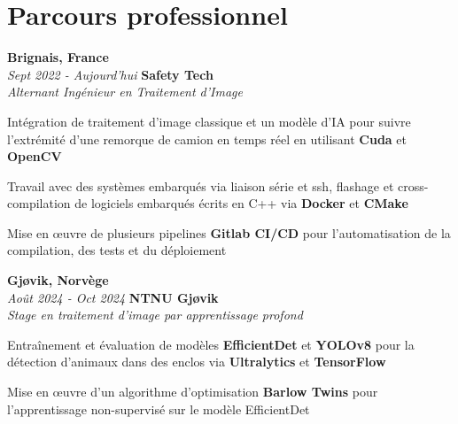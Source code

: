 
    \section{Parcours professionnel}
        \begin{twocolentry}{
			\textbf{Brignais, France} \\
			\textit{Sept 2022 - Aujourd'hui}
            }{
            \textbf{Safety Tech} \\
            \textit{Alternant Ingénieur en Traitement d'Image}
            }
        \end{twocolentry}

        \begin{onecolentry}
            \begin{highlights}
				\item Intégration de traitement d'image classique et un modèle d'IA pour suivre l'extrémité d'une remorque de camion en temps réel en utilisant \textbf{Cuda} et \textbf{OpenCV}
				\item Travail avec des systèmes embarqués via liaison série et ssh, flashage et cross-compilation de logiciels embarqués écrits en C++ via \textbf{Docker} et \textbf{CMake}
                \item Mise en œuvre de plusieurs pipelines \textbf{Gitlab CI/CD} pour l'automatisation de la compilation, des tests et du déploiement
            \end{highlights}
        \end{onecolentry}

        \begin{twocolentry}{
			\textbf{Gjøvik, Norvège} \\
			\textit{Août 2024 - Oct 2024}
            }{
			\textbf{NTNU Gjøvik} \\
			\textit{Stage en traitement d'image par apprentissage profond}
            }
        \end{twocolentry}

        \begin{onecolentry}
            \begin{highlights}
                \item Entraînement et évaluation de modèles \textbf{EfficientDet} et \textbf{YOLOv8} pour la détection d'animaux dans des enclos via \textbf{Ultralytics} et \textbf{TensorFlow}
                \item Mise en œuvre d'un algorithme d'optimisation \textbf{Barlow Twins} pour l'apprentissage non-supervisé sur le modèle EfficientDet
            \end{highlights}
        \end{onecolentry}

